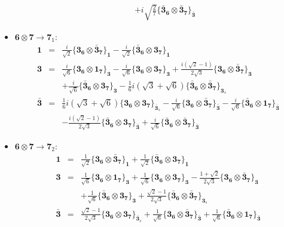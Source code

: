 \documentclass[english]{article}
\newcommand{\subcg}[3]{\big\{ {#1}\otimes{#2}\big\}^{}_{#3}}
\newcommand{\rep}[1]{\mathbf{#1}}
\begin{document}
\begin{itemize}
\begin{eqnarray*}
 & & +i \sqrt{\frac{2}{7}}\subcg{\rep{\bar{3}}_{\rep{6}}}{\rep{\bar{3}}_{\rep{7}}}{\rep{\bar{3}}}
\end{eqnarray*}
\item $\rep{6}\otimes\rep{7}\to\rep{7}_{1}$:
\begin{eqnarray*}
\rep{1} &=& \frac{i}{\sqrt{2}}\subcg{\rep{3}_{\rep{6}}}{\rep{\bar{3}}_{\rep{7}}}{\rep{1}}-\frac{i}{\sqrt{2}}\subcg{\rep{\bar{3}}_{\rep{6}}}{\rep{3}_{\rep{7}}}{\rep{1}}
\\
\rep{3} &=& \frac{i}{\sqrt{6}}\subcg{\rep{3}_{\rep{6}}}{\rep{1}_{\rep{7}}}{\rep{3}}-\frac{i}{\sqrt{6}}\subcg{\rep{3}_{\rep{6}}}{\rep{3}_{\rep{7}}}{\rep{3}}+\frac{i \left(\sqrt{2}-1\right)}{2 \sqrt{3}}\subcg{\rep{3}_{\rep{6}}}{\rep{\bar{3}}_{\rep{7}}}{\rep{3}} \\ 
 & & +\frac{i}{\sqrt{6}}\subcg{\rep{\bar{3}}_{\rep{6}}}{\rep{3}_{\rep{7}}}{\rep{3}}-\frac{1}{6} i \left(\sqrt{3}+\sqrt{6}\right)\subcg{\rep{\bar{3}}_{\rep{6}}}{\rep{\bar{3}}_{\rep{7}}}{\rep{3}_{s}}
\\
\rep{\bar{3}} &=& \frac{1}{6} i \left(\sqrt{3}+\sqrt{6}\right)\subcg{\rep{3}_{\rep{6}}}{\rep{3}_{\rep{7}}}{\rep{\bar{3}}_{s}}-\frac{i}{\sqrt{6}}\subcg{\rep{3}_{\rep{6}}}{\rep{\bar{3}}_{\rep{7}}}{\rep{\bar{3}}}-\frac{i}{\sqrt{6}}\subcg{\rep{\bar{3}}_{\rep{6}}}{\rep{1}_{\rep{7}}}{\rep{\bar{3}}} \\ 
 & & -\frac{i \left(\sqrt{2}-1\right)}{2 \sqrt{3}}\subcg{\rep{\bar{3}}_{\rep{6}}}{\rep{3}_{\rep{7}}}{\rep{\bar{3}}}+\frac{i}{\sqrt{6}}\subcg{\rep{\bar{3}}_{\rep{6}}}{\rep{\bar{3}}_{\rep{7}}}{\rep{\bar{3}}}
\end{eqnarray*}
\item $\rep{6}\otimes\rep{7}\to\rep{7}_{2}$:
\begin{eqnarray*}
\rep{1} &=& \frac{1}{\sqrt{2}}\subcg{\rep{3}_{\rep{6}}}{\rep{\bar{3}}_{\rep{7}}}{\rep{1}}+\frac{1}{\sqrt{2}}\subcg{\rep{\bar{3}}_{\rep{6}}}{\rep{3}_{\rep{7}}}{\rep{1}}
\\
\rep{3} &=& \frac{1}{\sqrt{6}}\subcg{\rep{3}_{\rep{6}}}{\rep{1}_{\rep{7}}}{\rep{3}}+\frac{1}{\sqrt{6}}\subcg{\rep{3}_{\rep{6}}}{\rep{3}_{\rep{7}}}{\rep{3}}-\frac{1+\sqrt{2}}{2 \sqrt{3}}\subcg{\rep{3}_{\rep{6}}}{\rep{\bar{3}}_{\rep{7}}}{\rep{3}} \\ 
 & & +\frac{1}{\sqrt{6}}\subcg{\rep{\bar{3}}_{\rep{6}}}{\rep{3}_{\rep{7}}}{\rep{3}}+\frac{\sqrt{2}-1}{2 \sqrt{3}}\subcg{\rep{\bar{3}}_{\rep{6}}}{\rep{\bar{3}}_{\rep{7}}}{\rep{3}_{s}}
\\
\rep{\bar{3}} &=& \frac{\sqrt{2}-1}{2 \sqrt{3}}\subcg{\rep{3}_{\rep{6}}}{\rep{3}_{\rep{7}}}{\rep{\bar{3}}_{s}}+\frac{1}{\sqrt{6}}\subcg{\rep{3}_{\rep{6}}}{\rep{\bar{3}}_{\rep{7}}}{\rep{\bar{3}}}+\frac{1}{\sqrt{6}}\subcg{\rep{\bar{3}}_{\rep{6}}}{\rep{1}_{\rep{7}}}{\rep{\bar{3}}} \\ 

\end{eqnarray*}
\end{itemize}
\end{document}
